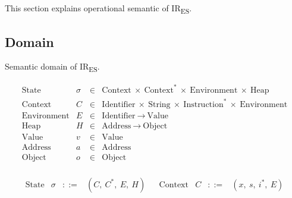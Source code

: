 \documentclass[11pt]{article}
\newcommand{\irname}[0]{IR\textsubscript{ES}\xspace}
\newcommand{\symstate}[0]{\sigma}
\newcommand{\symctx}[0]{C}
\newcommand{\symctxstack}[0]{C^*}
\newcommand{\symenv}[0]{E}
\newcommand{\symheap}[0]{H}
\newcommand{\symstatetuple}[4]{(#1,\ #2,\ #3,\ #4)}
\newcommand{\symstdef}[0]
{\symstatetuple{\symctx}{\symctxstack}{\symenv}{\symheap}}
\newcommand{\symctxtuple}[4]{(#1,\ #2,\ #3,\ #4)}
\newcommand{\symctxdef}[0]{\symctxtuple{x}{s}{i^*}{E}}
\begin{document}
This section explains operational semantic of \irname.

\subsection{Domain}

Semantic domain of \irname.

\[
\begin{array}{rrrl}
\text{State} &
\symstate &
\in &
\mbox{Context}\ \times\ \mbox{Context}^*\
\times\ \mbox{Environment}\ \times\ \mbox{Heap}
\\
\text{Context} & \symctx & \in &
\mbox{Identifier}\ \times\ \mbox{String}\
\times\ \mbox{Instruction}^*\ \times\ \mbox{Environment}
\\
\text{Environment} & \symenv & \in &
\mbox{Identifier}\ \to\ \mbox{Value}
\\
\text{Heap} & \symheap & \in &
\mbox{Address}\ \to\ \mbox{Object}
\\
\text{Value} & v & \in & \mbox{Value}
\\
\text{Address} & a & \in & \mbox{Address}
\\
\text{Object} & o & \in & \mbox{Object}
\\

\end{array}
\]

\[
\begin{array}{ccccccccc}
\text{State} & \symstate & ::= & \symstdef &  &
\text{Context} & \symctx & ::= & \symctxdef \\
\end{array}
\]
\end{document}
